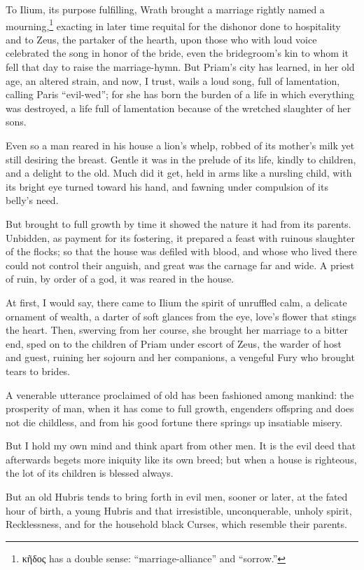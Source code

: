 \documentclass[12pt]{article}
\begin{document}
To Ilium, its purpose fulfilling, Wrath brought a marriage rightly named a mourning,\footnote{κῆδος has a double sense: ``marriage-alliance'' and ``sorrow.''} exacting in later time requital for the dishonor done to hospitality and to Zeus, the partaker of the hearth, upon those who with loud voice celebrated the song in honor of the bride, even the bridegroom's kin to whom it fell that day to raise the marriage-hymn. But Priam's city has learned, in her old age, an altered strain, and now, I trust, wails a loud song, full of lamentation, calling Paris ``evil-wed''; for she has born the burden of a life in which everything was destroyed, a life full of lamentation because of the wretched slaughter of her sons.

Even so a man reared in his house a lion's whelp, robbed of its mother's milk yet still desiring the breast. Gentle it was in the prelude of its life, kindly to children, and a delight to the old. Much did it get, held in arms like a nursling child, with its bright eye turned toward his hand, and fawning under compulsion of its belly's need.

But brought to full growth by time it showed the nature it had from its parents. Unbidden, as payment for its fostering, it prepared a feast with ruinous slaughter of the flocks; so that the house was defiled with blood, and whose who lived there could not control their anguish, and great was the carnage far and wide. A priest of ruin, by order of a god, it was reared in the house.

At first, I would say, there came to Ilium the spirit of unruffled calm, a delicate ornament of wealth, a darter of soft glances from the eye, love's flower that stings the heart. Then, swerving from her course, she brought her marriage to a bitter end, sped on to the children of Priam under escort of Zeus, the warder of host and guest, ruining her sojourn and her companions, a vengeful Fury who brought tears to brides.

A venerable utterance proclaimed of old has been fashioned among mankind: the prosperity of man, when it has come to full growth, engenders offspring and does not die childless, and from his good fortune there springs up insatiable misery.

But I hold my own mind and think apart from other men. It is the evil deed that afterwards begets more iniquity like its own breed; but when a house is righteous, the lot of its children is blessed always.

But an old Hubris tends to bring forth in evil men, sooner or later, at the fated hour of birth, a young Hubris and that irresistible, unconquerable, unholy spirit, Recklessness, and for the household black Curses, which resemble their parents.
\end{document}

